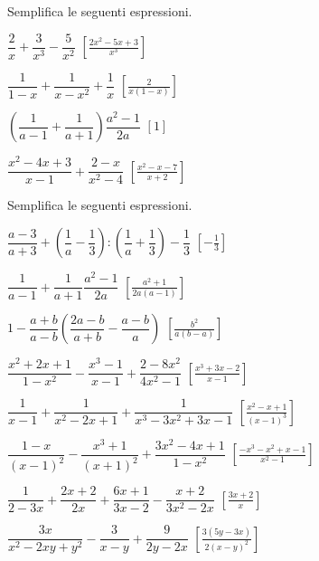 \begin{esercizio}[\Ast]
\label{ese:19.31}
Semplifica le seguenti espressioni.
\begin{multicols}{2}
\begin{enumeratea}
 \item $\dfrac{2}{x}+\dfrac{3}{x^{3}}-\dfrac{5}{x^{2}}$
  \hfill $\left[\frac{2x^{2}-5x+3}{x^{3}}\right]$
 \item $\dfrac{1}{1-x}+\dfrac{1}{x-x^{2}}+\dfrac{1}{x}$
  \hfill $\left[\frac{2}{x(1-x)}\right]$
 \item $\left(\dfrac{1}{a-1}+\dfrac{1}{a+1}\right)\dfrac{a^{2}-1}{2a}$
  \hfill $\left[1\right]$
 \item $\dfrac{x^{2}-4x+3}{x-1}+\dfrac{2-x}{x^{2}-4}$
  \hfill $\left[\frac{x^{2}-x-7}{x+2}\right]$
\end{enumeratea}
\end{multicols}
\end{esercizio}

\begin{esercizio}[\Ast]
Semplifica le seguenti espressioni.
\begin{enumeratea}
 \item $\dfrac{a-3}{a+3}+\left(\dfrac{1}{a}-\dfrac{1}{3}\right):
        \left(\dfrac{1}{a}+\dfrac{1}{3}\right)-\dfrac{1}{3}$
  \hfill $\left[-{\frac{1}{3}}\right]$
 \item $\dfrac{1}{a-1}+\dfrac{1}{a+1}\dfrac{a^{2}-1}{2a}$
  \hfill $\left[\frac{a^{2}+1}{2a(a-1)}\right]$
 \item $1-\dfrac{a+b}{a-b} \left(\dfrac{2a-b}{a+b}-\dfrac{a-b}{a}\right)$
  \hfill $\left[\frac{b^{2}}{a(b-a)}\right]$
 \item $\dfrac{x^{2}+2x+1}{1-x^{2}}-\dfrac{x^{3}-1}{x-1}+
        \dfrac{2-8x^{2}}{4x^{2}-1}$
  \hfill $\left[\frac{x^{3}+3x-2}{x-1}\right]$
 \item $\dfrac{1}{x-1}+\dfrac{1}{x^{2}-2x+1}+\dfrac{1}{x^{3}-3x^{2}+3x-1}$
  \hfill $\left[\frac{x^{2}-x+1}{(x-1)^{3}}\right]$
 \item $\dfrac{1-x}{(x-1)^{2}}-\dfrac{x^{3}+1}{(x+1)^{2}}+
        \dfrac{3x^{2}-4x+1}{1-x^{2}}$
  \hfill $\left[\frac{-x^{3}-x^{2}+x-1}{x^{2}-1}\right]$
 \item $\dfrac{1}{2-3x}+\dfrac{2x+2}{2x}+\dfrac{6x+1}{3x-2}-
        \dfrac{x+2}{3x^{2}-2x}$
  \hfill $\left[\frac{3x+2}{x}\right]$
 \item $\dfrac{3x}{x^{2}-2xy+y^{2}}-\dfrac{3}{x-y}+\dfrac{9}{2y-2x}$
  \hfill $\left[\frac{3(5y-3x)}{2(x-y)^{2}}\right]$
\end{enumeratea}
\end{esercizio}

